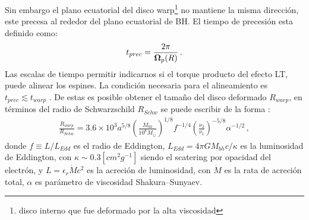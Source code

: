 Sin embargo el plano ecuatorial del disco warp\footnote{disco interno que fue deformado por la alta viscosidad} no mantiene la misma dirección, este precesa al rededor del plano ecuatorial de BH. El tiempo de precesión esta definido como:
%
\begin{align}
    t_{prec}= \frac{2\pi}{{\bf{\Omega}}_p(R)}\,.
\end{align}
%
Las escalas de tiempo permitir indicarnos si el torque producto del efecto LT, puede alinear los espines. La condición necesaria para el alineamiento es $t_{prec}\lesssim t_{warp}$ \cite{natarajan1999}. De estas es posible obtener el tamaño del disco deformado $R_{warp}$, en términos del radio de Schwarzschild $R_{Schw}$ se puede escribir de la forma \cite{volonteri2007}:
%
\begin{align}
    \frac{R_{warp}}{R_{Schw}}=3.6\times 10^{3}a^{5/8}\left(\frac{M_{bh}}{10^{8}M_{\odot}} \right)^{1/8}f^{-1/4}\left(\frac{\nu_{2}}{\nu_{1}} \right)^{-5/8}\alpha^{-1/2}\,,
\end{align}
%
donde $f\equiv L/L_{Edd}$ es el radio de Eddington, $L_{Edd}=4\pi GM_{bh}c/\kappa$ es  la luminosidad de Eddington, con $\kappa\sim 0.3 [cm^{2}g^{-1}]$ siendo el scatering por opacidad del electrón, y $L=\epsilon_{r}\dot{M}c^{2}$ es la acreción de luminosidad, con $\dot{M}$ es la rata de acreción total, $\alpha$ es parámetro de viscosidad Shakura–Sunyaev.

